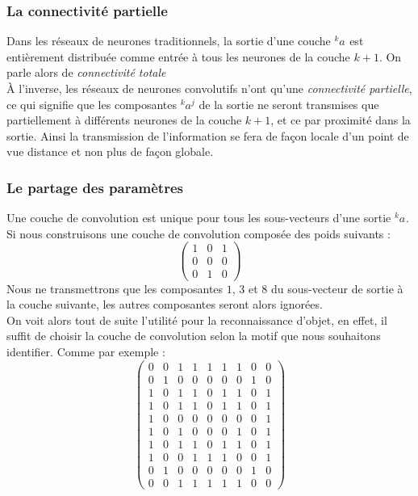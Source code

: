 \documentclass[10pt,a4paper]{report}
\newcommand{\lexp}[1]{\phantom{}^{#1}}
\newcommand{\elem}[4]{\lexp{#2}#1^{#3}_{#4}}
\begin{document}
			\subsubsection{La connectivité partielle}
			Dans les réseaux de neurones traditionnels, la sortie d'une couche $\elem{a}{k}{}{}$ est entièrement distribuée comme entrée à tous les neurones de la couche $k+1$. On parle alors de \emph{connectivité totale}\\
			À l'inverse, les réseaux de neurones convolutifs n'ont qu'une \emph{connectivité partielle}, ce qui signifie que les composantes $\elem{a}{k}{j}{}$ de la sortie ne seront transmises que partiellement à différents neurones de la couche $k+1$, et ce par proximité dans la sortie.
			Ainsi la transmission de l'information se fera de façon locale d'un point de vue distance et non plus de façon globale.
			\subsubsection{Le partage des paramètres}
			Une couche de convolution est unique pour tous les sous-vecteurs d'une sortie $\elem{a}{k}{}{}$.\\
			Si nous construisons une couche de convolution composée des poids suivants :
			$$
			\begin{pmatrix}
			1 & 0 & 1 \\ 
			0 & 0 & 0 \\ 
			0 & 1 & 0
			\end{pmatrix}
			$$
			Nous ne transmettrons que les composantes $1$, $3$ et $8$ du sous-vecteur de sortie à la couche suivante, les autres composantes seront alors ignorées.\\
			On voit alors tout de suite l'utilité pour la reconnaissance d'objet, en effet, il suffit de choisir la couche de convolution selon la motif que nous souhaitons identifier.
			Comme par exemple :
			$$
			\begin{pmatrix}
			0 & 0 & 1 & 1 & 1 & 1 & 1 & 0 & 0 \\ 
			0 & 1 & 0 & 0 & 0 & 0 & 0 & 1 & 0 \\ 
			1 & 0 & 1 & 1 & 0 & 1 & 1 & 0 & 1 \\ 
			1 & 0 & 1 & 1 & 0 & 1 & 1 & 0 & 1 \\ 
			1 & 0 & 0 & 0 & 0 & 0 & 0 & 0 & 1 \\
			1 & 0 & 1 & 0 & 0 & 0 & 1 & 0 & 1 \\
			1 & 0 & 1 & 1 & 0 & 1 & 1 & 0 & 1 \\ 
			1 & 0 & 0 & 1 & 1 & 1 & 0 & 0 & 1 \\ 
			0 & 1 & 0 & 0 & 0 & 0 & 0 & 1 & 0 \\ 
			0 & 0 & 1 & 1 & 1 & 1 & 1 & 0 & 0
			\end{pmatrix} 
			$$
\end{document}
